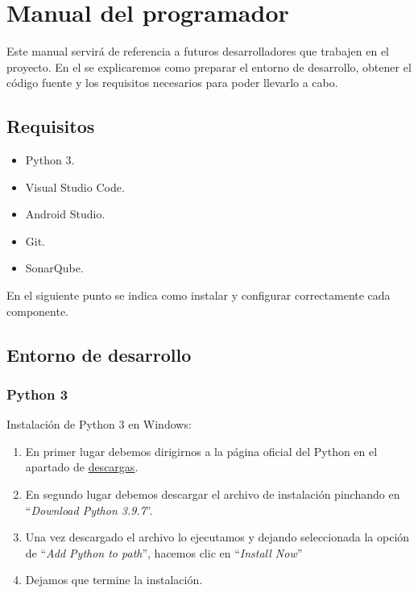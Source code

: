 \section{Manual del programador}

Este manual servirá de referencia a futuros desarrolladores que trabajen en el proyecto. En el se explicaremos como preparar el entorno de desarrollo, obtener el código fuente y los requisitos necesarios para poder llevarlo a cabo.

\subsection{Requisitos}

\begin{itemize}
\item
	Python 3.
\item
	Visual Studio Code.
\item
	Android Studio.
\item
	Git.
\item
	SonarQube.
\end{itemize}

En el siguiente punto se indica como instalar y configurar correctamente cada componente.


\subsection{Entorno de desarrollo}

\subsubsection{Python 3}

Instalación de Python 3 en Windows:
\begin{enumerate}
\item
	En primer lugar debemos dirigirnos a la página oficial del Python en el apartado de \href{https://www.python.org/downloads/}{descargas}.
\item
	En segundo lugar debemos descargar el archivo de instalación pinchando en ``\textit{Download Python 3.9.7}''.
\item
	Una vez descargado el archivo lo ejecutamos y dejando seleccionada la opción de ``\textit{Add Python to path}'', hacemos clic en ``\textit{Install Now}''
\item
	Dejamos que termine la instalación.
\end{enumerate}

